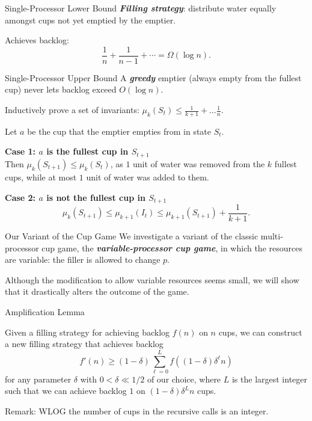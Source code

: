 \documentclass[xcolor=x11names, svgnames, rgb]{beamer}
\newcommand{\defn}[1]       {{\textit{\textbf{\boldmath #1}}}}
\begin{document}
\begin{frame}[t]{Single-Processor Lower Bound}
  \defn{Filling strategy}: distribute water equally amongst cups not yet emptied by the emptier.
  \vspace{1.5cm}

  Achieves backlog:
  $$\frac{1}{n} + \frac{1}{n-1} + \cdots = \Omega(\log n).$$
\end{frame}

\begin{frame}[t]{Single-Processor Upper Bound}
  A \defn{greedy} emptier (always empty from the fullest cup) never lets backlog exceed $O(\log n)$.
  \vspace{0.25cm}

  Inductively prove a set of invariants: $\mu_k(S_t) \le \frac{1}{k+1} + \ldots \frac{1}{n}$.

  Let $a$ be the cup that the emptier empties from in state $S_{t}$.

  \textbf{Case 1: $a$ is the fullest cup in $S_{t+1}$}\\
  Then $\mu_k(S_{t+1}) \le \mu_k(S_t)$, as $1$ unit of water was removed from
  the $k$ fullest cups, while at most $1$ unit of water was added to them.

  \textbf{Case 2: $a$ is not the fullest cup in $S_{t+1}$}
  $$\mu_k(S_{t+1}) \le \mu_{k+1}(I_t) \le \mu_{k+1}(S_{t+1}) + \frac{1}{k+1}.$$

\end{frame}

\begin{frame}[t]{Our Variant of the Cup Game}
We investigate a variant of the classic multi-processor cup game,
the \defn{variable-processor cup game}, in which the resources are variable:
the filler is allowed to change $p$.

\vspace{1cm}
Although the modification to allow variable resources seems small, we will
show that it drastically alters the outcome of the game.
\end{frame}

\begin{frame}[t]{Amplification Lemma}
  \begin{lemma}
    Given a filling strategy for achieving backlog $f(n)$ on $n$ cups, we can construct a new filling strategy that achieves backlog 
    $$f'(n) \ge (1-\delta)\sum_{\ell=0}^L f((1-\delta)\delta^\ell n)$$
    for any parameter $\delta$ with $0 < \delta \ll 1/2$ of our choice, where $L$
    is the largest integer such that we can achieve backlog $1$ on
    $(1-\delta)\delta^Ln$ cups.%
  \end{lemma}
  Remark: WLOG the number of cups in the recursive calls is an integer.
  
\end{frame}
\end{document}
